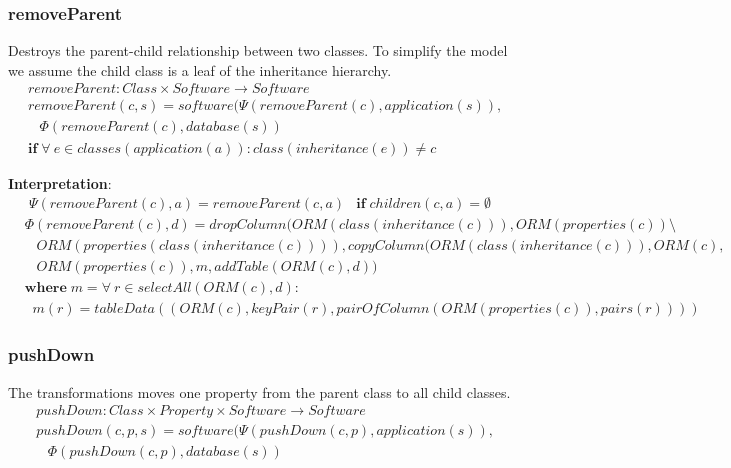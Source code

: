 \documentclass[10pt]{article}
\begin{document}
\subsubsection{removeParent}
Destroys the parent-child relationship between two classes. To simplify the model we assume the child class is a leaf of the inheritance hierarchy.
\begin{align}
& removeParent: Class \times Software \rightarrow Software \nonumber \\
& removeParent(c, s) = software(\Psi(removeParent(c), application(s)), \nonumber \\
& \;\;\;  \Phi(removeParent(c), database(s)) \nonumber \\
& \mathbf{if} \; \forall \: e \in classes(application(a)) : class(inheritance(e)) \neq c
\end{align}

\noindent \textbf{Interpretation}:
\begin{align}
\Psi(removeParent(c), a) = removeParent(c, a)
& \mathbf{if} \; children(c, a) = \emptyset
\end{align}
\begin{align}
&\Phi(removeParent(c), d) = 
 dropColumn(ORM(class(inheritance(c))), ORM(properties(c)) \setminus \nonumber \\ 
& \;\;\; ORM(properties(class(inheritance(c)))), copyColumn(ORM(class(inheritance(c))), ORM(c), \nonumber \\ 
& \;\;\; ORM(properties(c)), m, 
addTable(ORM(c), d)) \nonumber \\
& \mathbf{where} \; m = \forall \: r \in selectAll(ORM(c), d) : \nonumber \\  
& \;\; m(r) = tableData((ORM(c), keyPair(r), pairOfColumn(ORM(properties(c)), pairs(r))))  
\end{align}

\subsubsection{pushDown}
The transformations moves one property from the parent class to all child classes.
\begin{align}
& pushDown: Class \times Property \times Software \rightarrow Software \nonumber \\
& pushDown(c, p, s) = software(\Psi(pushDown(c, p), application(s)), \nonumber \\
& \;\;\; \Phi(pushDown(c, p), database(s))
\end{align}
\end{document}
